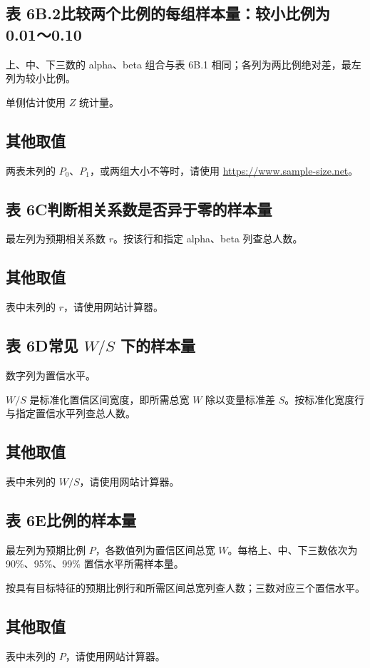 \subsection*{表 6B.2\quad 比较两个比例的每组样本量：较小比例为 0.01～0.10}
上、中、下三数的 alpha、beta 组合与表 6B.1 相同；各列为两比例绝对差，最左列为较小比例。

单侧估计使用 $Z$ 统计量。
\subsection{其他取值}
两表未列的 $P_0$、$P_1$，或两组大小不等时，请使用 \url{https://www.sample-size.net}。

\clearpage
{}
\subsection*{表 6C\quad 判断相关系数是否异于零的样本量}
最左列为预期相关系数 $r$。按该行和指定 alpha、beta 列查总人数。

\subsection{其他取值}
表中未列的 $r$，请使用网站计算器。

\clearpage
{}
\subsection*{表 6D\quad 常见 \texorpdfstring{$W/S$}{W/S} 下的样本量}
数字列为置信水平。

$W/S$ 是标准化置信区间宽度，即所需总宽 $W$ 除以变量标准差 $S$。按标准化宽度行与指定置信水平列查总人数。
\subsection{其他取值}
表中未列的 $W/S$，请使用网站计算器。

\clearpage
{}
\subsection*{表 6E\quad 比例的样本量}
最左列为预期比例 $P$，各数值列为置信区间总宽 $W$。每格上、中、下三数依次为 90\%、95\%、99\% 置信水平所需样本量。

按具有目标特征的预期比例行和所需区间总宽列查人数；三数对应三个置信水平。
\subsection{其他取值}
表中未列的 $P$，请使用网站计算器。

